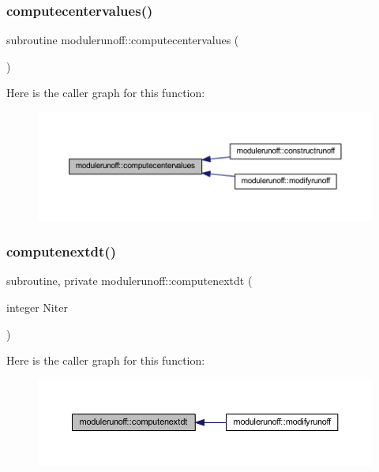 \subsubsection{\texorpdfstring{computecentervalues()}{computecentervalues()}}
{\footnotesize\ttfamily subroutine modulerunoff\+::computecentervalues (\begin{DoxyParamCaption}{ }\end{DoxyParamCaption})\hspace{0.3cm}{\ttfamily [private]}}

Here is the caller graph for this function\+:\nopagebreak
\begin{figure}[H]
\begin{center}
\leavevmode
\includegraphics[width=350pt]{namespacemodulerunoff_a922ce27a6758e75221357b9572099e5a_icgraph}
\end{center}
\end{figure}
\mbox{\label{namespacemodulerunoff_a7e93c436177a4089e806a4f1fdeedc77}} 
\subsubsection{\texorpdfstring{computenextdt()}{computenextdt()}}
{\footnotesize\ttfamily subroutine, private modulerunoff\+::computenextdt (\begin{DoxyParamCaption}\item[{integer}]{Niter }\end{DoxyParamCaption})\hspace{0.3cm}{\ttfamily [private]}}

Here is the caller graph for this function\+:\nopagebreak
\begin{figure}[H]
\begin{center}
\leavevmode
\includegraphics[width=350pt]{namespacemodulerunoff_a7e93c436177a4089e806a4f1fdeedc77_icgraph}
\end{center}
\end{figure}
\mbox{\label{namespacemodulerunoff_a275dc22b830688ac27f2e1ab0cec626c}} 

